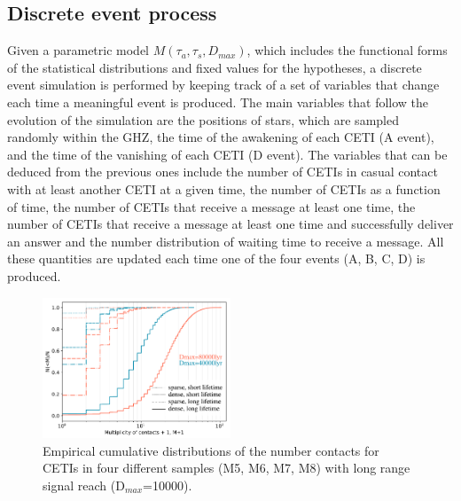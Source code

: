 \documentclass[crop]{CSLB}%
\begin{document}

\subsection{Discrete event process}

Given a parametric model $M(\tau_a, \tau_s, D_{max})$, which includes the
functional forms of the statistical distributions and fixed values for the
hypotheses, a discrete event simulation is performed by keeping track of a set
of variables that change each time a meaningful event is produced.
%
The main variables that follow the evolution of the simulation are the positions
of stars, which are sampled randomly within the GHZ, the time of the awakening
of each CETI (A event), and the time of the vanishing of each CETI (D event).
%
The variables that can be deduced from the previous ones include the number of
CETIs in casual contact with at least another CETI at a given time, the number
of CETIs as a function of time, the number of CETIs that receive a message at
least one time, the number of CETIs that receive a message at least one time and
successfully deliver an answer and the number distribution of waiting time to
receive a message.
%
All these quantities are updated each time one of the four events (A, B, C, D)
is produced.
          
          






                 
\begin{figure} \centering
   \includegraphics[width=0.5\textwidth]{F1.pdf}
   \caption{Empirical cumulative distributions of the number contacts
   for CETIs in four different samples (M5, M6, M7, M8) with long
   range signal reach (D$_{max}$=10000).
   }
\label{F_number_of_contacts} \end{figure}
   
\end{document}
